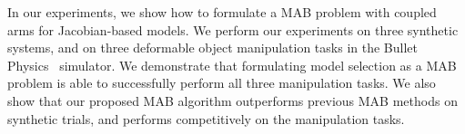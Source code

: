 In our experiments, we show how to formulate a \ac{MAB} problem with coupled arms for Jacobian-based models. We perform our experiments on three synthetic systems, and on three deformable object manipulation tasks in the Bullet Physics~\cite{Coumans2010} simulator. We demonstrate that formulating model selection as a \ac{MAB} problem is able to successfully perform all three manipulation tasks. We also show that our proposed \ac{MAB} algorithm outperforms previous \ac{MAB} methods on synthetic trials, and performs competitively on the manipulation tasks.






